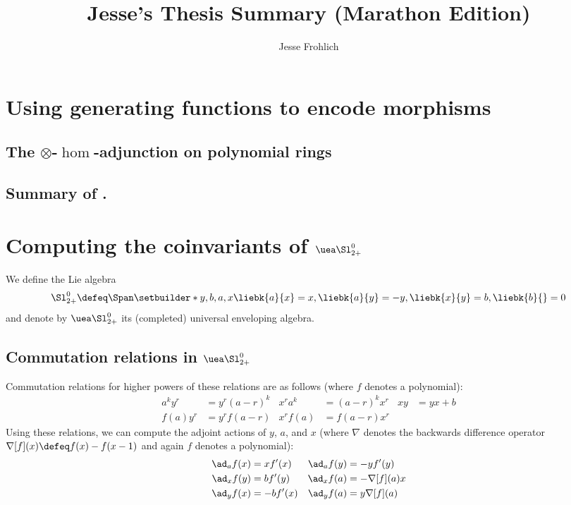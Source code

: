 \documentclass{article}
\title{Jesse's Thesis Summary (Marathon Edition)}
\author{Jesse Frohlich}
\begin{document}
\maketitle

\section{Using generating functions to encode morphisms}
\subsection{The $\otimes$-$\hom$-adjunction on polynomial rings}
\subsection{Summary of \cite{bv}.}

\section{Computing the coinvariants of $\CU$}
\begin{definition}
       We define the Lie algebra
       \begin{equation}
               \Alg \defeq
               \Span\setbuilder*{y, b, a, x}{
                       \liebk{a}{x}=x,
                       \liebk{a}{y}=-y,
                       \liebk{x}{y}=b,
                       \liebk{b}{}=0
               }
       \end{equation}
       and denote by $\CU$ its (completed) universal enveloping algebra.
\end{definition}

\subsection{Commutation relations in $\CU$}
Commutation relations for higher powers of these relations are as follows (where
$f$ denotes a polynomial):
\begin{align}
        a^ky^r &= y^r(a-r)^{k} &
        x^ra^{k} &= (a-r)^kx^r &
        xy &= yx + b
        \\
        f(a)y^r &= y^rf(a-r) &
        x^rf(a) &= f(a-r)x^r &
\end{align}
Using these relations, we can compute the adjoint actions of $y$, $a$, and $x$
(where $\nabla$ denotes the backwards difference operator $\nabla[f](x) \defeq
f(x) - f(x-1)$ and again $f$ denotes a polynomial):
\begin{align}
  \ad_a f(x) &= xf'(x)&
  \ad_a f(y) &= -yf'(y)\label{eq:ada}\\
  \ad_x f(y) &= bf'(y) &
  \ad_x f(a) &= -\nabla[f](a)x\label{eq:adx}\\
  \ad_y f(x) &= -bf'(x) &
  \ad_y f(a) &= y\nabla[f](a)\label{eq:ady}
\end{align}
\end{document}
